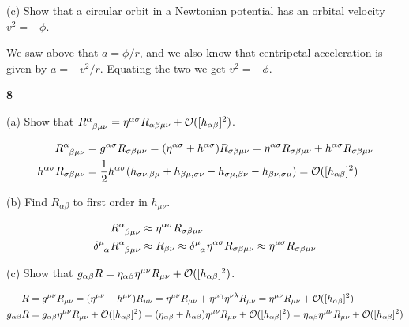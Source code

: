\documentclass[gr-notes.tex]{subfiles}
\begin{document}
(c) Show that a circular orbit in a Newtonian potential has an orbital velocity $v^2 = -\phi$.

We saw above that $a = \phi / r$, and we also know that centripetal acceleration is given by $a = -v^2 / r$. Equating the two we get $v^2 = -\phi$.


\textbf{8}

(a) Show that $\tensor{R}{^\alpha_{\beta\mu\nu}} = \eta^{\alpha\sigma} R_{\alpha\beta\mu\nu} + \order*{[h_{\alpha\beta}]^2}$.

\begin{align*}
  \tensor{R}{^\alpha_{\beta\mu\nu}} &=
  g^{\alpha\sigma} R_{\sigma\beta\mu\nu} =
  (\eta^{\alpha\sigma} + h^{\alpha\sigma}) R_{\sigma\beta\mu\nu} =
  \eta^{\alpha\sigma} R_{\sigma\beta\mu\nu} + h^{\alpha\sigma} R_{\sigma\beta\mu\nu}
  \\
  h^{\alpha\sigma} R_{\sigma\beta\mu\nu} &=
  \frac{1}{2} h^{\alpha\sigma}
  (h_{\sigma\nu,\beta\mu} + h_{\beta\mu,\sigma\nu} -
   h_{\sigma\mu,\beta\nu} - h_{\beta\nu,\sigma\mu}) =
  \order*{[h_{\alpha\beta}]^2}
\end{align*}

(b) Find $R_{\alpha\beta}$ to first order in $h_{\mu\nu}$.

\begin{align*}
  \tensor{R}{^\alpha_{\beta\mu\nu}} &\approx
  \eta^{\alpha\sigma} R_{\sigma\beta\mu\nu}
  \\
  \tensor{\delta}{^\mu_\alpha} \tensor{R}{^\alpha_{\beta\mu\nu}} &\approx
  R_{\beta\nu} \approx
  \tensor{\delta}{^\mu_\alpha} \eta^{\alpha\sigma} R_{\sigma\beta\mu\nu} \approx
  \eta^{\mu\sigma} R_{\sigma\beta\mu\nu}
\end{align*}

(c) Show that $g_{\alpha\beta} R = \eta_{\alpha\beta} \eta^{\mu\nu} R_{\mu\nu} + \order*{[h_{\alpha\beta}]^2}$.

\begin{align*}
  R &=
  g^{\mu\nu} R_{\mu\nu} =
  (\eta^{\mu\nu} + h^{\mu\nu}) R_{\mu\nu} =
  \eta^{\mu\nu} R_{\mu\nu} + \eta^{\mu\gamma} \eta^{\nu\lambda} R_{\mu\nu} =
  \eta^{\mu\nu} R_{\mu\nu} + \order*{[h_{\alpha\beta}]^2}
  \\
  g_{\alpha\beta} R &=
  g_{\alpha\beta} \eta^{\mu\nu} R_{\mu\nu} + \order*{[h_{\alpha\beta}]^2} =
  (\eta_{\alpha\beta} + h_{\alpha\beta})
  \eta^{\mu\nu} R_{\mu\nu} + \order*{[h_{\alpha\beta}]^2} =
  \eta_{\alpha\beta} \eta^{\mu\nu} R_{\mu\nu} + \order*{[h_{\alpha\beta}]^2}
\end{align*}
\end{document}
